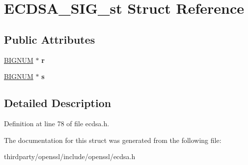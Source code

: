 \hypertarget{struct_e_c_d_s_a___s_i_g__st}{}\section{E\+C\+D\+S\+A\+\_\+\+S\+I\+G\+\_\+st Struct Reference}
\label{struct_e_c_d_s_a___s_i_g__st}
\subsection*{Public Attributes}
\begin{DoxyCompactItemize}
\item 
\mbox{\label{struct_e_c_d_s_a___s_i_g__st_aa4a144f7356b7e62243af763e584fd0f}} 
\hyperlink{structbignum__st}{B\+I\+G\+N\+UM} $\ast$ {\bfseries r}
\item 
\mbox{\label{struct_e_c_d_s_a___s_i_g__st_a784f9869eb36cd84ea750b3ac58075ca}} 
\hyperlink{structbignum__st}{B\+I\+G\+N\+UM} $\ast$ {\bfseries s}
\end{DoxyCompactItemize}


\subsection{Detailed Description}


Definition at line 78 of file ecdsa.\+h.



The documentation for this struct was generated from the following file\+:\begin{DoxyCompactItemize}
\item 
thirdparty/openssl/include/openssl/ecdsa.\+h\end{DoxyCompactItemize}

